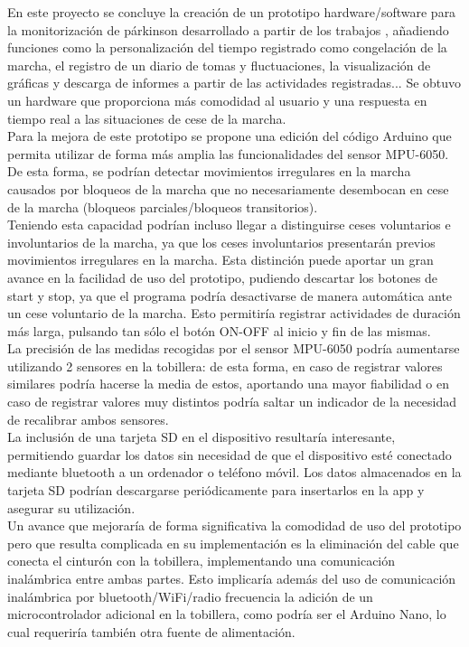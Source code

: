 
En este proyecto se concluye la creación de un prototipo hardware/software para la monitorización de párkinson desarrollado a partir de los trabajos \cite{Gonzalez2023} 
 \cite{Martos2024}, añadiendo funciones como la personalización del tiempo registrado como congelación de la marcha, el registro de un diario de tomas y fluctuaciones, la visualización de gráficas y descarga de informes a partir de las actividades registradas... Se obtuvo un hardware que proporciona más comodidad al usuario y una respuesta en tiempo real a las situaciones de cese de la marcha.\\

Para la mejora de este prototipo se propone una edición del código Arduino que permita utilizar de forma más amplia las funcionalidades del sensor MPU-6050. De esta forma, se podrían detectar movimientos irregulares en la marcha causados por bloqueos de la marcha que no necesariamente desembocan en cese de la marcha (bloqueos parciales/bloqueos transitorios).\\

Teniendo esta capacidad podrían incluso llegar a distinguirse ceses voluntarios e involuntarios de la marcha, ya que los ceses involuntarios presentarán previos movimientos irregulares en la marcha. Esta distinción puede aportar un gran avance en la facilidad de uso del prototipo, pudiendo descartar los botones de start y stop, ya que el programa podría desactivarse de manera automática ante un cese voluntario de la marcha. Esto permitiría registrar actividades de duración más larga, pulsando tan sólo el botón ON-OFF al inicio y fin de las mismas.\\

La precisión de las medidas recogidas por el sensor MPU-6050 podría aumentarse utilizando 2 sensores en la tobillera: de esta forma, en caso de registrar valores similares podría hacerse la media de estos, aportando una mayor fiabilidad o en caso de registrar valores muy distintos podría saltar un indicador de la necesidad de recalibrar ambos sensores.\\

La inclusión de una tarjeta SD en el dispositivo resultaría interesante, permitiendo guardar los datos sin necesidad de que el dispositivo esté conectado mediante bluetooth a un ordenador o teléfono móvil. Los datos almacenados en la tarjeta SD podrían descargarse periódicamente para insertarlos en la app y asegurar su utilización.\\

Un avance que mejoraría de forma significativa la comodidad de uso del prototipo pero que resulta complicada en su implementación es la eliminación del cable que conecta el cinturón con la tobillera, implementando una comunicación inalámbrica entre ambas partes. Esto implicaría además del uso de comunicación inalámbrica por bluetooth/WiFi/radio frecuencia la adición de un microcontrolador adicional en la tobillera, como podría ser el Arduino Nano, lo cual requeriría también otra fuente de alimentación.\\

